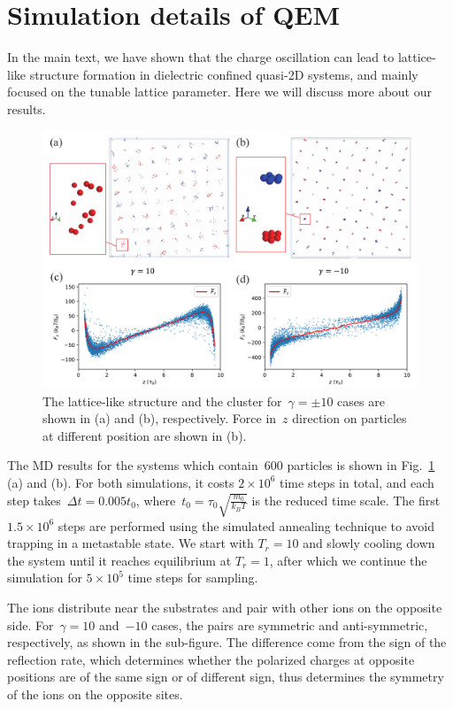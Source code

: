\section{Simulation details of QEM}

In the main text, we have shown that the charge oscillation can lead to lattice-like structure formation in dielectric confined quasi-2D systems, and mainly focused on the tunable lattice parameter.
Here we will discuss more about our results.

\begin{figure}[htbp]
    \centering
    \includegraphics[width = \linewidth]{figs/MD_ball.pdf}
    \caption{The lattice-like structure and the cluster for~$\gamma = \pm 10$ cases are shown in (a) and (b), respectively. Force in~$z$ direction on particles at different position are shown in (b).}
    \label{fig:balls}
\end{figure}

The MD results for the systems which contain~$600$ particles is shown in Fig.~\ref{fig:balls} (a) and (b).
For both simulations, it costs $2 \times 10^6$ time steps in total, and each step takes~$\Delta t = 0.005 t_0$, where~$t_0 = \tau_0 \sqrt{\frac{m_0}{k_B T}}$ is the reduced time scale.
The first $1.5\times 10^6$ steps are performed using the simulated annealing technique to avoid trapping in a metastable state. We start with $T_r=10$ and slowly cooling down the system until it reaches equilibrium at $T_r=1$, after which we continue the simulation for $5 \times 10^5$ time steps for sampling.

The ions distribute near the substrates and pair with other ions on the opposite side.
For~$\gamma = 10$ and~$-10$ cases, the pairs are symmetric and anti-symmetric, respectively, as shown in the sub-figure.
The difference come from the sign of the reflection rate, which determines whether the polarized charges at opposite positions are of the same sign or of different sign, thus determines the symmetry of the ions on the opposite sites.

